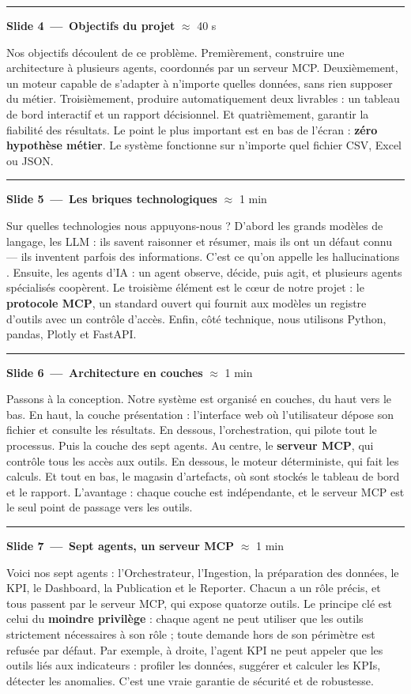 \documentclass[11pt,a4paper]{article}
\newcommand{\slidecue}[3]{%
  \needspace{4\baselineskip}%
  \medskip\par\noindent
  {\color{accentdark}\rule[-3pt]{4pt}{17pt}}\hspace{8pt}%
  {\large\bfseries\color{ink}Slide #1\, — \,#2}%
  \hfill{\small\color{muted}#3}\par
  \nopagebreak\smallskip}
\begin{document}
\slidecue{4}{Objectifs du projet}{$\approx$ 40 s}
Nos objectifs découlent de ce problème. Premièrement, construire une
architecture à plusieurs agents, coordonnés par un serveur MCP. Deuxièmement,
un moteur capable de s'adapter à n'importe quelles données, sans rien supposer
du métier. Troisièmement, produire automatiquement deux livrables : un tableau
de bord interactif et un rapport décisionnel. Et quatrièmement, garantir la
fiabilité des résultats. Le point le plus important est en bas de l'écran :
\textbf{zéro hypothèse métier}. Le système fonctionne sur n'importe quel fichier
CSV, Excel ou JSON.

\slidecue{5}{Les briques technologiques}{$\approx$ 1 min}
Sur quelles technologies nous appuyons-nous ? D'abord les grands modèles de
langage, les LLM : ils savent raisonner et résumer, mais ils ont un défaut
connu — ils inventent parfois des informations. C'est ce qu'on appelle les
\og hallucinations \fg{}. Ensuite, les agents d'IA : un agent observe, décide,
puis agit, et plusieurs agents spécialisés coopèrent. Le troisième élément est
le c\oe ur de notre projet : le \textbf{protocole MCP}, un standard ouvert qui
fournit aux modèles un registre d'outils avec un contrôle d'accès. Enfin, côté
technique, nous utilisons Python, pandas, Plotly et FastAPI.

\slidecue{6}{Architecture en couches}{$\approx$ 1 min}
Passons à la conception. Notre système est organisé en couches, du haut vers le
bas. En haut, la couche présentation : l'interface web où l'utilisateur dépose
son fichier et consulte les résultats. En dessous, l'orchestration, qui pilote
tout le processus. Puis la couche des sept agents. Au centre, le \textbf{serveur
MCP}, qui contrôle tous les accès aux outils. En dessous, le moteur
déterministe, qui fait les calculs. Et tout en bas, le magasin d'artefacts, où
sont stockés le tableau de bord et le rapport. L'avantage : chaque couche est
indépendante, et le serveur MCP est le seul point de passage vers les outils.

\slidecue{7}{Sept agents, un serveur MCP}{$\approx$ 1 min}
Voici nos sept agents : l'Orchestrateur, l'Ingestion, la préparation des
données, le KPI, le Dashboard, la Publication et le Reporter. Chacun a un rôle
précis, et tous passent par le serveur MCP, qui expose quatorze outils. Le
principe clé est celui du \textbf{moindre privilège} : chaque agent ne peut
utiliser que les outils strictement nécessaires à son rôle ; toute demande hors
de son périmètre est refusée par défaut. Par exemple, à droite, l'agent KPI ne
peut appeler que les outils liés aux indicateurs : profiler les données,
suggérer et calculer les KPIs, détecter les anomalies. C'est une vraie garantie
de sécurité et de robustesse.
\end{document}

